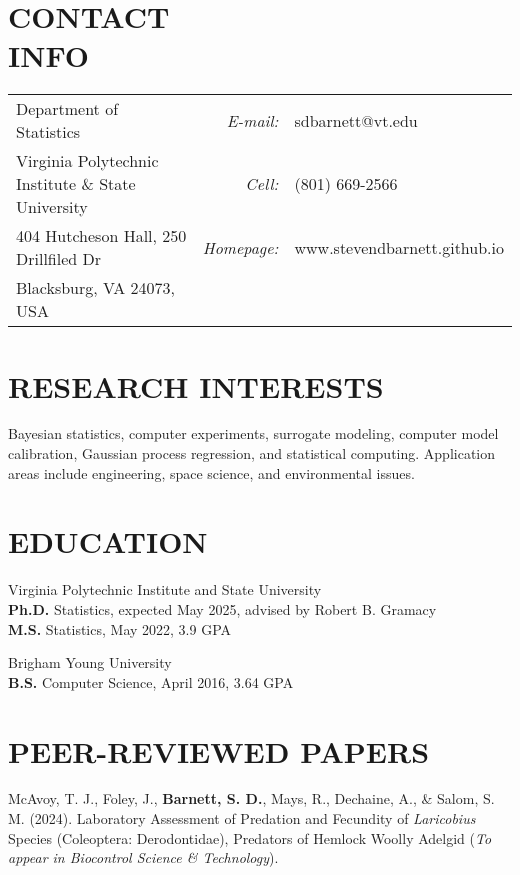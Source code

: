 \documentclass[margin,line]{res}
\begin{document}

\begin{resume}

\vspace{-0.1cm}
\section{\bf CONTACT\\INFO}
\vspace{.05in}
\begin{tabular}{@{}p{2.7in}rp{2in}}
Department of Statistics  & {\it E-mail:} & sdbarnett@vt.edu \\
Virginia Polytechnic Institute \& State University & {\it Cell:} & (801) 669-2566 \\
404 Hutcheson Hall, 250 Drillfiled Dr & {\it Homepage:} & www.stevendbarnett.github.io \\
Blacksburg, VA 24073, USA
\end{tabular}

\medskip
\section{\bf RESEARCH INTERESTS}
Bayesian statistics, computer experiments, surrogate modeling, computer model calibration, Gaussian process regression, and statistical computing. Application areas include engineering, space science, and environmental issues.

\section{\bf EDUCATION}
{\sc Virginia Polytechnic Institute and State University}\\
{\bf Ph.D.} Statistics, expected May 2025, advised by Robert B. Gramacy \\
{\bf M.S.} Statistics, May 2022, 3.9 GPA

{\sc Brigham Young University} \\
{\bf B.S.} Computer Science, April 2016, 3.64 GPA

\section{\bf{PEER-REVIEWED PAPERS}}

McAvoy, T. J., Foley, J., \textbf{Barnett, S. D.}, Mays, R., Dechaine, A., \& Salom, S. M. (2024). Laboratory Assessment of Predation and Fecundity of \textit{Laricobius} Species (Coleoptera: Derodontidae), Predators of Hemlock Woolly Adelgid (\textit{To appear in Biocontrol Science \& Technology}).


\end{resume}
\end{document}
